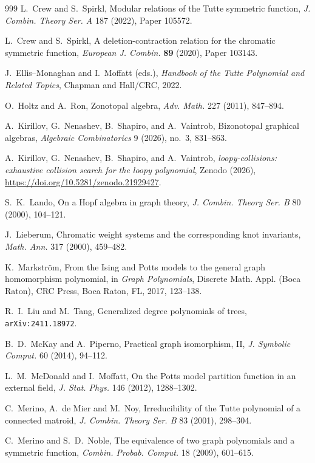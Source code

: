 \documentclass[11pt]{article}
\theoremstyle{plain}
\theoremstyle{definition}
\numberwithin{equation}{section}
\begin{document}
\begin{thebibliography}{999}
  L.~Crew and S.~Spirkl,
  Modular relations of the Tutte symmetric function,
  \emph{J. Combin. Theory Ser. A} 187 (2022), Paper 105572.

  L.~Crew and S.~Spirkl,
  A deletion-contraction relation for the chromatic symmetric function,
  \emph{European J. Combin.} \textbf{89} (2020), Paper 103143.


J.~Ellis--Monaghan and I.~Moffatt (eds.),
\emph{Handbook of the Tutte Polynomial and Related Topics},
Chapman and Hall/CRC, 2022.

O.~Holtz and A.~Ron,
Zonotopal algebra,
\emph{Adv. Math.} 227 (2011), 847--894.

  A.~Kirillov, G.~Nenashev, B.~Shapiro, and A.~Vaintrob,
  Bizonotopal graphical algebras,
  \emph{Algebraic Combinatorics} 9 (2026), no.~3, 831--863.


  A.~Kirillov, G.~Nenashev, B.~Shapiro, and A.~Vaintrob,
  \emph{loopy-collisions: exhaustive collision search for the loopy   polynomial}, Zenodo (2026),
  \url{https://doi.org/10.5281/zenodo.21929427}.

  S.~K.~Lando,
  On a Hopf algebra in graph theory,
  \emph{J. Combin. Theory Ser. B} 80 (2000), 104--121.

  J.~Lieberum,
  Chromatic weight systems and the corresponding knot invariants,
  \emph{Math. Ann.} 317 (2000), 459--482.

  K.~Markstr\"om,
  From the Ising and Potts models to the general graph homomorphism polynomial,
  in \emph{Graph Polynomials},
  Discrete Math. Appl. (Boca Raton), CRC Press, Boca Raton, FL, 2017, 123--138.


  R.~I.~Liu and M.~Tang,
  Generalized degree polynomials of trees,
  \texttt{arXiv:2411.18972}.

  B.~D.~McKay and A.~Piperno,
  Practical graph isomorphism, II,
  \emph{J. Symbolic Comput.} 60 (2014), 94--112.

  L.~M.~McDonald and I.~Moffatt,
  On the Potts model partition function in an external field,
  \emph{J. Stat. Phys.} 146 (2012), 1288--1302.

C.~Merino, A.~de Mier and M.~Noy,
Irreducibility of the Tutte polynomial of a connected matroid,
\emph{J. Combin. Theory Ser. B} 83 (2001), 298--304.

  C.~Merino and S.~D.~Noble,
  The equivalence of two graph polynomials and a symmetric function,
  \emph{Combin. Probab. Comput.} 18 (2009), 601--615.


\end{thebibliography}
\end{document}
